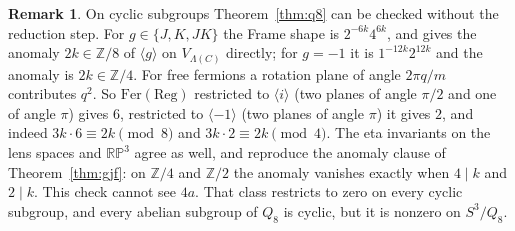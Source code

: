 \documentclass[11pt]{amsart}
\theoremstyle{definition}
\newtheorem{remark}[theorem]{Remark}
\begin{document}
\begin{remark}\label{rem:cyc}
On cyclic subgroups Theorem~\ref{thm:q8} can be checked without the reduction step. For $g\in\{J,K,JK\}$ the
Frame shape is $2^{-6k}4^{6k}$, and \cite[Ex.~4.4]{GJF} gives the anomaly $2k\in\mathbb Z/8$ of $\langle g\rangle$
on $V_{\Lambda(C)}$ directly; for $g=-1$ it is $1^{-12k}2^{12k}$ and the anomaly is $2k\in\mathbb Z/4$. For free
fermions a rotation plane of angle $2\pi q/m$ contributes $q^2$. So $\mathrm{Fer}(\mathrm{Reg})$ restricted to
$\langle i\rangle$ (two planes of angle $\pi/2$ and one of angle $\pi$) gives $6$, restricted to $\langle-1\rangle$
(two planes of angle $\pi$) it gives $2$, and indeed $3k\cdot6\equiv2k\pmod8$ and $3k\cdot2\equiv2k\pmod4$. The eta
invariants on the lens spaces and $\mathbb{RP}^3$ agree as well, and reproduce the anomaly clause of
Theorem~\ref{thm:gjf}: on $\mathbb Z/4$ and $\mathbb Z/2$ the anomaly vanishes exactly when $4\mid k$ and $2\mid k$.
This check cannot see $4a$. That class restricts to zero on every cyclic subgroup, and every abelian subgroup of
$Q_8$ is cyclic, but it is nonzero on $S^3/Q_8$.


\end{remark}
\end{document}
